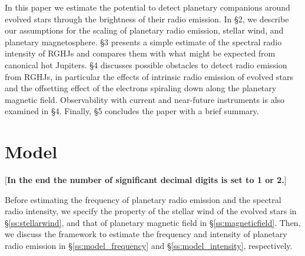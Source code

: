 \documentclass{emulateapj}
\def\memoYF#1{\color{red}$[${\bf #1}$]$ \color{black}}
\begin{document}
In this paper we estimate the potential to detect planetary companions around evolved stars through the brightness of their radio emission. 
In \S2, we describe our assumptions for the scaling of planetary radio emission, stellar wind, and planetary magnetosphere.
\S3 presents a simple estimate of the spectral radio intensity of RGHJs and compares them with what might be expected from canonical hot Jupiters.
\S4 discusses possible obstacles to detect radio emission from RGHJs, in particular the effects of intrinsic radio emission of evolved stars and the offsetting effect of the electrons spiraling down along the planetary magnetic field.
Observability with current and near-future instruments is also examined in \S4. 
Finally, \S5 concludes the paper with a brief summary. 



\section{Model}
\label{s:assumptions}

\memoYF{In the end the number of significant decimal digits is set to 1 or 2.}

Before estimating the frequency of planetary radio emission and the spectral radio intensity, we specify the property of the stellar wind of the evolved stars in \S\ref{ss:stellarwind}, and that of planetary magnetic field in \S\ref{ss:magneticfield}.  
Then, we discuss the framework to estimate the frequency and intensity of planetary radio emission in \S\ref{ss:model_frequency} and \S\ref{ss:model_intensity}, respectively. 
\end{document}
